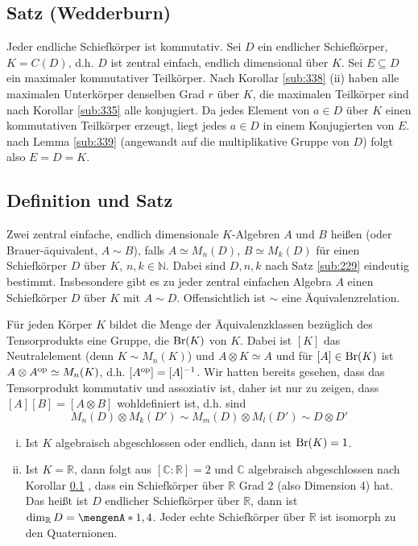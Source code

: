 \subsection[Satz (Wedderburn): Endliche Schiefkörper sind kommutativ]{Satz (Wedderburn)} %
\label{sub:340}
Jeder endliche Schiefkörper ist kommutativ.
Sei $D$ ein endlicher Schiefkörper, $K= C(D)$, d.h. $D$ ist zentral einfach, endlich dimensional über $K$. Sei $E \subseteq D$ ein maximaler kommutativer Teilkörper.
Nach Korollar \ref{sub:338} (ii) haben alle maximalen Unterkörper denselben Grad $r$ über $K$, die maximalen Teilkörper sind nach Korollar \ref{sub:335} alle konjugiert.
Da jedes Element von $a \in D$ über $K$ einen kommutativen Teilkörper erzeugt, liegt jedes $a \in D$ in einem Konjugierten von $E$. nach Lemma \ref{sub:339} (angewandt auf 
die multiplikative Gruppe von $D$) folgt also $E=D=K$. \bewende

\subsection[Definition und Satz: Die Brauergruppe]{Definition und Satz} %
\label{sub:341}
Zwei zentral einfache, endlich dimensionale $K$-Algebren $A$ und $B$ heißen  (oder Brauer-äquivalent, $A \sim B$), falls $A\simeq M_n(D)$, $B\simeq M_k(D)$ 
für einen Schiefkörper $D$ über $K$, $n,k \in \mathds{N}$. Dabei sind $D,n,k$ nach Satz \ref{sub:229} eindeutig bestimmt. Insbesondere gibt es zu jeder zentral einfachen 
Algebra $A$ einen Schiefkörper $D$ über $K$ mit $A \sim D$. Offensichtlich ist $\sim$ eine Äquivalenzrelation. 

Für jeden Körper $K$ bildet die Menge der Äquivalenzklassen bezüglich des
Tensorprodukts eine Gruppe, die  $\operatorname{Br}(K)$ von $K$. Dabei ist $[K]$ das Neutralelement (denn $K \sim M_n(K)$) und $A \otimes K \simeq A$ und für
$[A] \in \operatorname{Br}(K)$ ist $A \otimes A^{\mathrm{op}} \simeq M_n(K)$, d.h. $[A^{\mathrm{op}}] = [A]^{-1}$.
Wir hatten bereits gesehen, dass das Tensorprodukt kommutativ und assoziativ ist, daher ist nur zu zeigen, dass
\(
	[A] [B] = [A \otimes B]
\)
wohldefiniert ist, d.h. sind 
\[
	M_n(D) \otimes M_k(D') \sim M_m(D) \otimes M_l(D') \sim D \otimes D'
\]
\begin{enumerate}[(i)]
	\item Ist $K$ algebraisch abgeschlossen oder endlich, dann ist $\operatorname{Br}(K)=1$.
	\item Ist $K=\mathds{R}$, dann folgt aus $[\mathds{C} : \mathds{R}]=2$ und $\mathds{C}$ algebraisch abgeschlossen nach Korollar \ref{sub:340} ,
	dass ein Schiefkörper über $\mathds{R}$ Grad 2 (also Dimension 4) hat. Das heißt ist $D$ endlicher Schiefkörper über $\mathds{R}$, dann ist $\dim_\mathds{R}D=\set{1,4}$.
	Jeder echte Schiefkörper über $\mathds{R}$ ist isomorph zu den Quaternionen.
\end{enumerate}
\newpage


